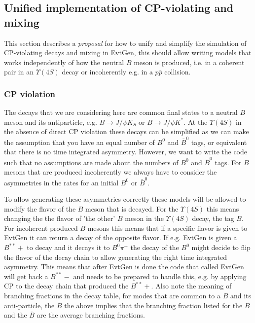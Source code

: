 \newpage

\subsection{Unified implementation of CP-violating and mixing}

This section describes a {\it proposal} for how to unify and 
simplify the simulation of CP-violating decays and mixing in EvtGen, this 
should allow writing models that works independently of
how the neutral $B$ meson is produced, i.e. in a coherent pair in an
$\Upsilon(4S)$ decay or incoherently e.g. in a $p\bar p$ collision.

\subsubsection{CP violation}

The decays that we are considering here are 
common final states to a neutral $B$ meson and its antiparticle,
e.g. $B\to J/\psi K_S$
or $B\to J/\psi K^*$. At the $\Upsilon(4S)$ in the absence of
direct CP violation these decays can be simplified as we can make the 
assumption that you have an equal number of $B^0$ and $\bar B^0$
tags, or equivalent that there is no time integrated asymmetry.
However, we want to write the code such that no assumptions are
made about the numbers of $B^0$ and $\bar B^0$ tags.
For $B$ mesons that are produced incoherently we always have to
consider the asymmetries in the rates for an initial $B^0$ or
$\bar B^0$. 

To allow generating these asymmetries correctly these models
will be allowed to modify the flavor of the $B$ meson that is decayed.
For the $\Upsilon(4S)$ this means changing the the flavor of 'the
other' $B$ meson in the $\Upsilon(4S)$ decay, the tag $B$. 
For incoherent produced $B$
mesons this means that if a specific flavor is given to 
EvtGen it can return a decay of the opposite flavor. If
e.g. EvtGen is given a $B^{**}+$ to decay and it decays it to
$B^0\pi^+$ the decay of the $B^0$ might decide to flip the 
flavor of the decay chain to allow generating the right 
time integrated asymmetry. This means that after EvtGen is
done the code that called EvtGen will get back a $B^{**}-$
and needs to be prepared to handle this, e.g. by applying CP
to the decay chain that produced the $B^{**}+$. Also note the
meaning of branching fractions in the decay table, for modes
that are common to a $B$ and its anti-particle, the $\bar B$
the above implies that the branching fraction listed for the
$B$ and the $\bar B$ are the average branching fractions.


